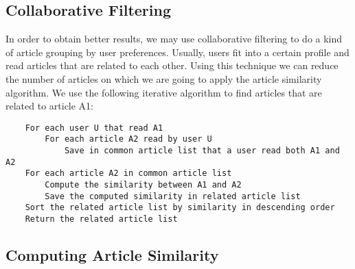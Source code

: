 \subsection{Collaborative Filtering}
\label{sec:collaborative-filtering}
In order to obtain better results, we may use collaborative filtering to do a kind of article grouping by user preferences. Usually, users fit into a certain profile and read articles that are related to each other. Using this technique we can reduce the number of articles on which we are going to apply the article similarity algorithm. We use the following iterative algorithm\cite{item-to-item-recomm} to find articles that are related to article A1:
\lstset{language=make,caption=Item to item collaborative filtering,label=lst:app-make}
\begin{lstlisting}
	For each user U that read A1
		For each article A2 read by user U
			Save in common article list that a user read both A1 and A2
	For each article A2 in common article list
		Compute the similarity between A1 and A2
		Save the computed similarity in related article list
	Sort the related article list by similarity in descending order
	Return the related article list
\end{lstlisting}

\subsection{Computing Article Similarity}
\label{sec:computing-article-similarity}

